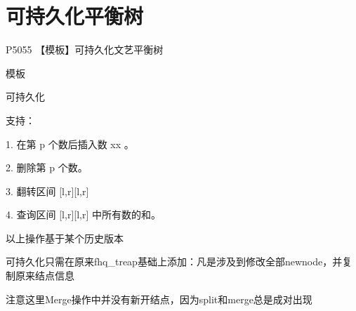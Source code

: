 \section{可持久化平衡树}

P5055 【模板】可持久化文艺平衡树

模板

可持久化

支持：

1. 在第 p 个数后插入数 xx 。

2. 删除第 p 个数。

3. 翻转区间 [l,r][l,r]

4. 查询区间 [l,r][l,r] 中所有数的和。

以上操作基于某个历史版本

可持久化只需在原来fhq\_treap基础上添加：凡是涉及到修改全部newnode，并复制原来结点信息

注意这里Merge操作中并没有新开结点，因为split和merge总是成对出现

